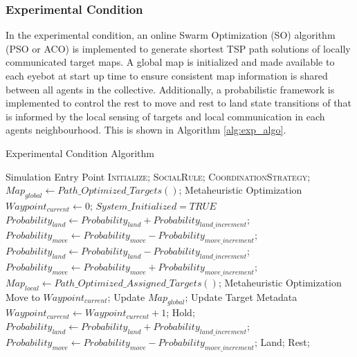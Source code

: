 \documentclass{report}
\begin{document}
\newpage

\subsubsection{Experimental Condition}
In the experimental condition, an online Swarm Optimization (SO) algorithm (PSO or ACO) is implemented to generate shortest TSP path solutions of locally communicated target maps. A global map is initialized and made available to each eyebot at start up time to ensure consistent map information is shared between all agents in the collective. Additionally, a probabilistic framework is implemented to control the rest to move and rest to land state transitions of that is informed by the local sensing of targets and local communication in each agents neighbourhood. This is shown in Algorithm \ref{alg:exp_algo}.

\begin{algorithm}[H]
	\caption{Experimental Condition Algorithm}
	\label{alg:exp_algo}
	\begin{algorithmic}[1]
		 {} \Comment Simulation Entry Point
				\State \textsc{Initialize};
				\State \textsc{SocialRule};
				\State \textsc{CoordinationStrategy};
			\EndWhile
		\EndProcedure
		\\
				\State $Map_{global} \gets Path\_Optimized\_Targets()$; \Comment Metaheuristic Optimization
				\State $Waypoint_{current} \gets 0$;
				\State $System\_Initialized = TRUE$
			\EndIf
		\EndProcedure
		\\
					\State $Probability_{land} \gets Probability_{land} + Probability_{land\_increment}$;
					\State $Probability_{move} \gets Probability_{move} - Probability_{move\_increment}$;
					\State $Probability_{land} \gets Probability_{land} - Probability_{land\_increment}$;
					\State $Probability_{move} \gets Probability_{move} + Probability_{move\_increment}$;
				\EndIf
			\EndIf
		\EndProcedure
		\\
				\State $Map_{local} \gets Path\_Optimized\_Assigned\_Targets()$; \Comment Metaheuristic Optimization
				\State Move to $Waypoint_{current}$;
						\State Update $Map_{global}$; \Comment Update Target Metadata
						\State $Waypoint_{current} \gets Waypoint_{current} + 1$;
					\Else
						\State Hold;
					\EndIf
					\State $Probability_{land} \gets Probability_{land} + Probability_{land\_increment}$;
					\State $Probability_{move} \gets Probability_{move} - Probability_{move\_increment}$;
				\EndIf
				\State Land;
			\Else
				\State Rest;
			\EndIf
		\EndProcedure
	\end{algorithmic}
\end{algorithm}
\end{document}
